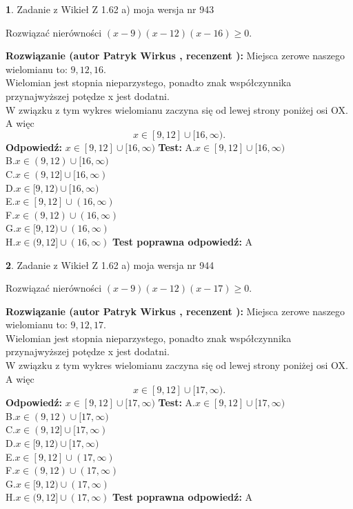 \documentclass[12pt, a4paper]{article}
\theoremstyle{definition} %
\newtheorem{zad}{}
\newcommand{\zadStart}[1]{\begin{zad}#1\newline}
\newcommand{\zadStop}{\end{zad}}
\newcommand{\rozwStart}[2]{\noindent \textbf{Rozwiązanie (autor #1 , recenzent #2): }\newline}
\newcommand{\rozwStop}{\newline}
\newcommand{\odpStart}{\noindent \textbf{Odpowiedź:}\newline}
\newcommand{\odpStop}{\newline}
\newcommand{\testStart}{\noindent \textbf{Test:}\newline}
\newcommand{\testStop}{\newline}
\newcommand{\kluczStart}{\noindent \textbf{Test poprawna odpowiedź:}\newline}
\newcommand{\kluczStop}{\newline}
\begin{document}
\zadStart{Zadanie z Wikieł Z 1.62 a) moja wersja nr 943}

Rozwiązać nierówności $(x-9)(x-12)(x-16)\ge0$.
\zadStop
\rozwStart{Patryk Wirkus}{}
Miejsca zerowe naszego wielomianu to: $9, 12, 16$.\\
Wielomian jest stopnia nieparzystego, ponadto znak współczynnika przy\linebreak najwyższej potędze x jest dodatni.\\ W związku z tym wykres wielomianu zaczyna się od lewej strony poniżej osi OX. A więc $$x \in [9,12] \cup [16,\infty).$$
\rozwStop
\odpStart
$x \in [9,12] \cup [16,\infty)$
\odpStop
\testStart
A.$x \in [9,12] \cup [16,\infty)$\\
B.$x \in (9,12) \cup [16,\infty)$\\
C.$x \in (9,12] \cup [16,\infty)$\\
D.$x \in [9,12) \cup [16,\infty)$\\
E.$x \in [9,12] \cup (16,\infty)$\\
F.$x \in (9,12) \cup (16,\infty)$\\
G.$x \in [9,12) \cup (16,\infty)$\\
H.$x \in (9,12] \cup (16,\infty)$
\testStop
\kluczStart
A
\kluczStop



\zadStart{Zadanie z Wikieł Z 1.62 a) moja wersja nr 944}

Rozwiązać nierówności $(x-9)(x-12)(x-17)\ge0$.
\zadStop
\rozwStart{Patryk Wirkus}{}
Miejsca zerowe naszego wielomianu to: $9, 12, 17$.\\
Wielomian jest stopnia nieparzystego, ponadto znak współczynnika przy\linebreak najwyższej potędze x jest dodatni.\\ W związku z tym wykres wielomianu zaczyna się od lewej strony poniżej osi OX. A więc $$x \in [9,12] \cup [17,\infty).$$
\rozwStop
\odpStart
$x \in [9,12] \cup [17,\infty)$
\odpStop
\testStart
A.$x \in [9,12] \cup [17,\infty)$\\
B.$x \in (9,12) \cup [17,\infty)$\\
C.$x \in (9,12] \cup [17,\infty)$\\
D.$x \in [9,12) \cup [17,\infty)$\\
E.$x \in [9,12] \cup (17,\infty)$\\
F.$x \in (9,12) \cup (17,\infty)$\\
G.$x \in [9,12) \cup (17,\infty)$\\
H.$x \in (9,12] \cup (17,\infty)$
\testStop
\kluczStart
A
\kluczStop
\end{document}
